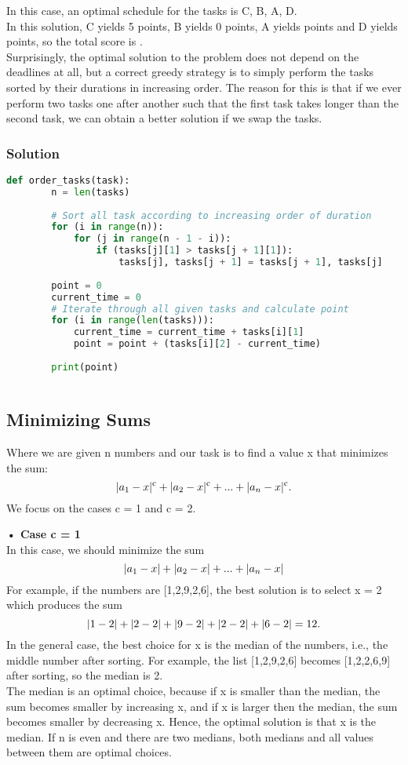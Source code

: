 \documentclass[12pt]{article}
\begin{document}
    In this case, an optimal schedule for the tasks is C, B, A, D.\\
    In this solution, C yields 5 points, B yields 0 points, A yields  points and D yields  points, so the total score is .\\
    Surprisingly, the optimal solution to the problem does not depend on the deadlines at all, but a correct greedy strategy is to simply perform the tasks sorted by their durations in increasing order. The reason for this is that if we ever perform two tasks one after another such that the first task takes longer than the second task, we can obtain a better solution if we swap the tasks.
    \subsubsection{Solution}
     \begin{lstlisting}[language=Python]
     def order_tasks(task):
        n = len(tasks) 
        
        # Sort all task according to increasing order of duration 
        for (i in range(n)): 
            for (j in range(n - 1 - i)): 
                if (tasks[j][1] > tasks[j + 1][1]): 
                    tasks[j], tasks[j + 1] = tasks[j + 1], tasks[j]
        
        point = 0
        current_time = 0
        # Iterate through all given tasks and calculate point
        for (i in range(len(tasks))): 
            current_time = current_time + tasks[i][1]
            point = point + (tasks[i][2] - current_time)
            
        print(point) 
        
    \end{lstlisting}
    \subsection{Minimizing Sums}
    Where we are given n numbers and our task is to find a value x that minimizes the sum:
    \[|a_1 \-- x|\textsuperscript{c} +|a_2 \-- x|\textsuperscript{c} + ... +|a_n \-- x|\textsuperscript{c}.\]
    We focus on the cases c = 1 and c = 2.
    
    \textbf{• Case c = 1}\\
    In this case, we should minimize the sum
    \[|a_1 \-- x| +|a_2 \-- x| + ... +|a_n \-- x|\]
    For example, if the numbers are [1,2,9,2,6], the best solution is to select x = 2 which produces the sum
    \[|1\--2| +|2\--2| +|9\--2| +|2\--2| +|6\--2| = 12.\]
    In the general case, the best choice for x is the median of the numbers, i.e., the middle number after sorting. For example, the list [1,2,9,2,6] becomes [1,2,2,6,9] after sorting, so the median is 2.\\
    The median is an optimal choice, because if x is smaller than the median, the sum becomes smaller by increasing x, and if x is larger then the median, the sum becomes smaller by decreasing x. Hence, the optimal solution is that x is the median. If n is even and there are two medians, both medians and all values between them are optimal choices.
    
\end{document}

